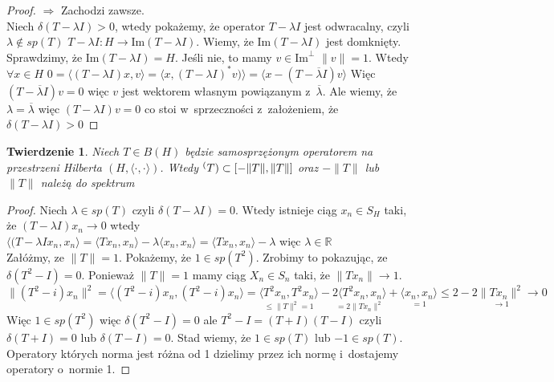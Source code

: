 \documentclass[11pt]{mwrep}
\renewcommand{\[}{\begin{equation}}
\renewcommand{\]}{\end{equation}}
\newcommand{\R}{{\ensuremath{\mathbb R}}}
\newcommand{\scal}{\langle \cdot,\cdot \rangle}
\newtheorem{twr}[subsection]{Twierdzenie}%
\begin{document}
\begin{proof}
	$\Rightarrow$ Zachodzi zawsze.\\
	Niech $\delta(T - \lambda I)>0$, wtedy pokażemy, że operator $T - \lambda I$ jest odwracalny, czyli $\lambda \not \in sp(T)$
	$T-\lambda I \colon H \to \textrm{Im} (T - \lambda I)$. Wiemy, że $\textrm{Im} (T- \lambda I)$ jest domknięty. 
	Sprawdzimy, że $\textrm{Im}(T-\lambda I) = H$. Jeśli nie, to mamy $v \in \textrm{Im}^\perp$  $\|v\|=1$.
	Wtedy $\forall x \in H$ $0= \langle (T - \lambda I) x ,v  \rangle = \langle  x, (T - \lambda I)^* v)  \rangle = \langle x - (T- \overline{\lambda} I) v \rangle$
	Więc $(T - \overline{\lambda} I) v=0$ więc $v$ jest wektorem własnym powiązanym z~$\overline{\lambda}$. Ale wiemy, że $\lambda=\overline\lambda$
	więc $(T - \lambda I) v =0$ co stoi w~sprzeczności z~założeniem, że $\delta(T- \lambda I) >0$ 

\end{proof}
\begin{twr}
	Niech  $T\in B(H)$ będzie samosprzężonym operatorem na przestrzeni Hilberta $(H,\scal)$. Wtedy 
	$\sp(T) \subset [-\|T\|, \|T\|]$ oraz $-\|T\|$ lub $\|T\|$ należą do spektrum 
\end{twr}
\begin{proof}
	Niech $\lambda \in sp (T)$ czyli $\delta(T - \lambda I) =0 $. Wtedy istnieje ciąg $x_n \in S_H$ taki, że
	$(T- \lambda I)x_n \to 0$ wtedy $ \langle (T - \lambda I x_n, x_n  \rangle = \langle Tx_n ,x_n \rangle - \lambda\langle x_n, x_n \rangle
	= \langle T x_n, x_n  \rangle - \lambda$  więc $\lambda \in \R$\\
	Załóżmy, ze $\|T\|=1$. Pokażemy, że $1 \in sp(T^2)$. Zrobimy to pokazując, ze $\delta(T^2 - I ) =0$.
	Ponieważ $\|T\| =1$ mamy ciąg $X_n \in S_n$ taki, że $\|T {x_n}\| \to 1$.
	$$\|(T^2-i) x_n\|^2 = \langle (T^2-i) x_n, (T^2-i) x_n \rangle = \underset{\le \|T\|^2 =1}{\langle T^2 x_n, T^2 x_n   \rangle} - 
	\underset{=2\|T x_n\|^2}{ 2 \langle T^2 x_n, x _n \rangle} 
	+\underset{=1}{\langle x_n, x _n \rangle} \le 2 - 2\underset{\to 1}{\|T x_n \|^2} \to 0$$ 
	Więc $1 \in sp(T^2)$ więc $\delta(T^2 - I) = 0$ ale $T^2 - I = (T+I)(T - I)$
	czyli $\delta(T+I) =0 $ lub $\delta(T - I) =0$. Stad wiemy, że $1 \in sp(T)$ lub $-1 \in sp(T)$.
	Operatory których norma jest różna od 1 dzielimy przez ich normę i~dostajemy operatory o~normie 1. 
\end{proof}
\end{document}
